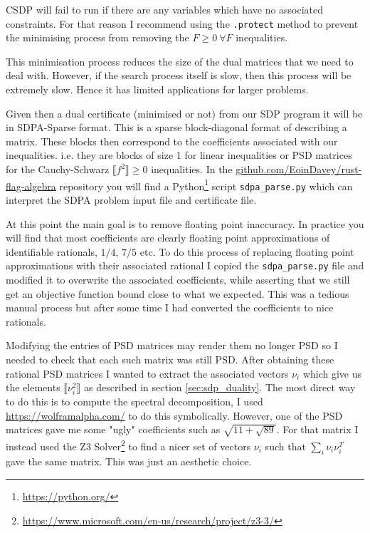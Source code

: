 \begin{note*}
    CSDP will fail to run if there are any variables which have no associated constraints.
    For that reason I recommend using the \verb|.protect| method to prevent the minimising
    process from removing the $F \geq 0\ \forall F$ inequalities.
\end{note*}

This minimisation process reduces the size of the dual matrices that we need to deal with.
However, if the search process itself is slow, then this process will be extremely slow.
Hence it has limited applications for larger problems.

Given then a dual certificate (minimised or not) from our SDP program it will be in
SDPA-Sparse format. This is a sparse block-diagonal format of describing a matrix.
These blocks then correspond to the coefficients associated with our inequalities. i.e.
they are blocks of size 1 for linear inequalities or PSD matrices for the Cauchy-Schwarz
$\llbracket f^2 \rrbracket \geq 0$ inequalities. In the
\url{github.com/EoinDavey/rust-flag-algebra} repository you will find a
Python\footnote{\url{https://python.org/}} script \verb|sdpa_parse.py| which can
interpret the SDPA problem input file and certificate file.

At this point the main goal is to remove floating point inaccuracy. In practice you
will find that most coefficients are clearly floating point approximations of identifiable
rationals, $1/4$, $7/5$ etc. To do this process of replacing floating point approximations with
their associated rational I copied the \verb|sdpa_parse.py| file and modified it to
overwrite the associated coefficients, while asserting that we still get an
objective function bound close to what we expected.
This was a tedious manual process but after some time I had converted the coefficients to
nice rationals.

Modifying the entries of PSD matrices may render them no longer PSD so
I needed to check that each such matrix was still PSD. After obtaining these rational
PSD matrices I wanted to extract the associated vectors $\nu_i$ which give us the
elements $\llbracket \nu_i^2 \rrbracket$ as described in section \ref{sec:sdp_duality}.
The most direct way to do this is to compute the spectral decomposition, I used
\url{https://wolframalpha.com/} to do this symbolically. However, one of the PSD matrices
gave me some "ugly" coefficients such as $\sqrt{11 + \sqrt{89}}$. For that matrix
I instead used the Z3 Solver\footnote{\url{https://www.microsoft.com/en-us/research/project/z3-3/}}
to find a nicer set of vectors $\nu_i$ such that $\sum_i \nu_i\nu_i^T$ gave the same
matrix. This was just an aesthetic choice.

